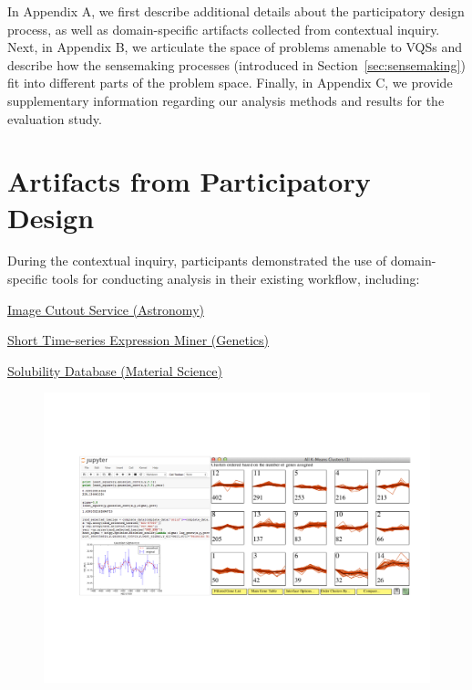  \appendix
 \npar In Appendix A, we first describe additional details about the participatory design process, as well as domain-specific artifacts collected from contextual inquiry. Next, in Appendix B, we articulate the space of problems amenable to VQSs and describe how the sensemaking processes (introduced in Section~\ref{sec:sensemaking}) fit into different parts of the problem space. Finally, in Appendix C, we provide supplementary information regarding our analysis methods and results for the evaluation study.
 \section{Artifacts from Participatory Design\label{apdx:pdartifact}}
 \npar During the contextual inquiry, participants demonstrated the use of domain-specific tools for conducting analysis in their existing workflow, including:
   \begin{denselist}
     \item \href{http://descut.cosmology.illinois.edu}{Image Cutout Service (Astronomy)}
     \item \href{http://cs.cmu.edu/~jernst/stem/}{Short Time-series Expression Miner (Genetics)}
     \item \href{http://srdata.nist.gov/solubility/}{Solubility Database (Material Science)}
   \end{denselist}
\begin{figure}[h!]
 \centering
 \includegraphics[width=\linewidth]{figures/CIscreenshot.pdf}
 \caption{}
 \label{CIscreenshot}
 \vspace*{-15pt}
\end{figure}
